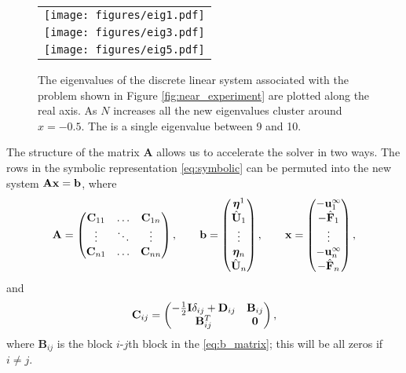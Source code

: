 \begin{figure}[!h]
\begin{center}
\begin{tabular}{c}
\texttt{[image: figures/eig1.pdf]}\\
\texttt{[image: figures/eig3.pdf]}\\
\texttt{[image: figures/eig5.pdf]}\\
\end{tabular}
\end{center}
\caption[Eigenvalue clusters]{The eigenvalues of the discrete linear system associated with the problem shown in Figure \ref{fig:near_experiment} are plotted along the real axis. As $N$ increases all the new eigenvalues cluster around $x=-0.5$. The is a single eigenvalue between 9 and 10.}\label{fig:eigenvalues}
\end{figure}


The structure of the matrix $\mathbf{A}$ allows us to accelerate the solver in two ways.  The rows in the symbolic representation \eqref{eq:symbolic} can be permuted into the new system $\mathbf{A}{\mathbf{x}} = {\mathbf{b}}$, where
\begin{equation}\label{eq:system_permute} \mathbf{A} =  \begin{pmatrix} \mathbf{C}_{11} & \hdots & \mathbf{C}_{1n} \\ \vdots & \ddots & \vdots\\ \mathbf{C}_{n1} & \hdots & \mathbf{C}_{nn}\end{pmatrix}, \qquad {\mathbf{b}} = \begin{pmatrix} \bm{\eta}^1 \\ \hat{{\mathbf{U}}}_1 \\  \vdots \\\bm{\eta}_n \\ \hat{{\mathbf{U}}}_n\end{pmatrix}, \qquad {\mathbf{x}} = \begin{pmatrix} -{\mathbf{u}}^\infty_1 \\ -\hat{{\mathbf{F}}}_1 \\ \vdots \\ -{\mathbf{u}}^\infty_n \\ -\hat{{\mathbf{F}}}_n \end{pmatrix},\end{equation}
and 
\[ {\mathbf{C}}_{ij} = \begin{pmatrix} -\frac{1}{2}\mathbf{I}\delta_{ij} + \mathbf{D}_{ij} & {\mathbf{B}}_{ij} \\ {\mathbf{B}}_{ij}^T & \mathbf{0}\end{pmatrix}, \]
where $\mathbf{B}_{ij}$ is the block $i$-$j$th block in the \eqref{eq:b_matrix}; this will be all zeros if $i\ne j$.

